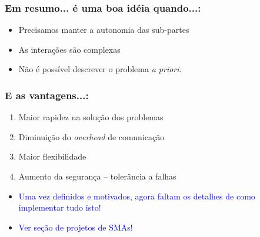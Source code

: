 \begin{frame} %

\frametitle{Em resumo... é uma boa idéia quando...:}


\begin{itemize}
  \item Precisamos manter a autonomia das sub-partes
  \item As interações são complexas
  \item Não é possível descrever o problema \textit{a priori}.
\end{itemize}
\end{frame}

\begin{frame} %

\frametitle{E as  vantagens...:}

\begin{block}{}
\begin{enumerate}
  \item Maior rapidez na solução dos problemas
  \item Diminuição do \textit{overhead} de comunicação
  \item Maior flexibilidade
  \item Aumento da segurança -- tolerância a falhas
\end{enumerate}

\begin{itemize}
  \item \textcolor{blue}{Uma vez definidos e motivados, agora faltam os detalhes 
de como implementar tudo isto!}

 \item \textcolor{blue}{Ver seção de projetos de SMAs!}

\end{itemize}
\end{block}

\end{frame}



